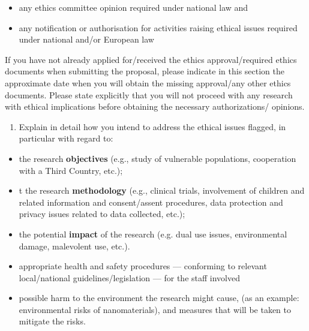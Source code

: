 \begin{itemize}
  \item any ethics committee opinion required under national law
  and 
  \item any notification or authorisation for activities raising
  ethical issues required under national and/or European law 
\end{itemize}

\medskip\noindent
If you have not already applied for/received the ethics
approval/required ethics documents when submitting the proposal,
please indicate in this section the approximate date when you will
obtain the missing approval/any other ethics documents. Please
state explicitly that you will not proceed with any research with
ethical implications before obtaining the necessary
authorizations/ opinions.

\medskip\noindent
{}

\bigskip

{\bf
\begin{enumerate}[resume, start=2]
  \item Explain in detail how you intend to address the ethical
  issues flagged, in particular with regard to:
\end{enumerate}
} \begin{itemize}
    \item the research \textbf{objectives} (e.g., study
    of vulnerable populations, cooperation with a Third Country,
    etc.);

    \item t the research {\bf methodology} (e.g., clinical trials,
    involvement of children and related information and
    consent/assent procedures, data protection and
    privacy issues related to data collected, etc.);

    \item the potential {\bf impact} of the research (e.g. dual
    use issues, environmental damage, malevolent use, etc.).

    \item appropriate health and safety procedures --- conforming to
    relevant local/national guidelines/legislation --- for the staff
    involved 
    
    \item possible harm to the environment the research might
    cause, (as an example: environmental risks of nanomaterials),
    and measures that will be taken to mitigate the risks.
\end{itemize}

